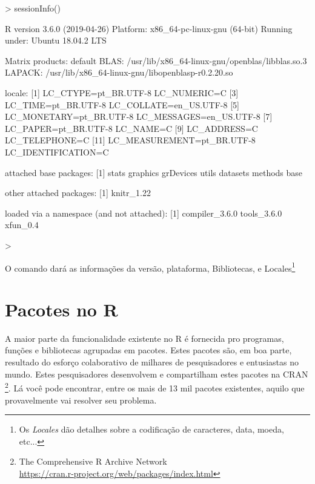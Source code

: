 \documentclass[12pt,a4paper,oneside]{erdc}
\begin{document}
\begin{Schunk}
\begin{Sinput}
> sessionInfo()
\end{Sinput}
\begin{Soutput}
R version 3.6.0 (2019-04-26)
Platform: x86_64-pc-linux-gnu (64-bit)
Running under: Ubuntu 18.04.2 LTS

Matrix products: default
BLAS:   /usr/lib/x86_64-linux-gnu/openblas/libblas.so.3
LAPACK: /usr/lib/x86_64-linux-gnu/libopenblasp-r0.2.20.so

locale:
 [1] LC_CTYPE=pt_BR.UTF-8       LC_NUMERIC=C              
 [3] LC_TIME=pt_BR.UTF-8        LC_COLLATE=en_US.UTF-8    
 [5] LC_MONETARY=pt_BR.UTF-8    LC_MESSAGES=en_US.UTF-8   
 [7] LC_PAPER=pt_BR.UTF-8       LC_NAME=C                 
 [9] LC_ADDRESS=C               LC_TELEPHONE=C            
[11] LC_MEASUREMENT=pt_BR.UTF-8 LC_IDENTIFICATION=C       

attached base packages:
[1] stats     graphics  grDevices utils     datasets  methods   base     

other attached packages:
[1] knitr_1.22

loaded via a namespace (and not attached):
[1] compiler_3.6.0 tools_3.6.0    xfun_0.4      
\end{Soutput}
\begin{Sinput}
> 
\end{Sinput}
\end{Schunk}


O comando dará as informações da versão, plataforma, Bibliotecas, e Locales\footnote{Os \textit{Locales} dão detalhes sobre a codificação de caracteres, data, moeda, etc...}




\section{Pacotes no R}
\label{sec:Pacotes}

A maior parte da funcionalidade existente no R é fornecida pro programas, funções e bibliotecas agrupadas em pacotes. Estes pacotes são, em boa parte, resultado do esforço colaborativo de milhares de pesquisadores e entusiastas no mundo. Estes pesquisadores desenvolvem e compartilham estes pacotes na CRAN \footnote{The Comprehensive R Archive Network \\ \url{https://cran.r-project.org/web/packages/index.html}}. Lá você pode encontrar, entre os mais de 13 mil pacotes existentes, aquilo que  provavelmente vai resolver seu problema.
\end{document}
